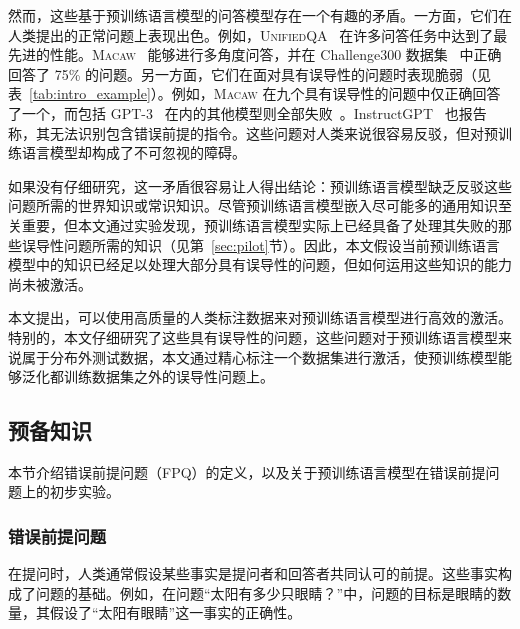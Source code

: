 然而，这些基于预训练语言模型的问答模型存在一个有趣的矛盾。一方面，它们在人类提出的正常问题上表现出色。例如，\textsc{UnifiedQA}~\cite{khashabi-etal-2020-unifiedqa} 在许多问答任务中达到了最先进的性能。\textsc{Macaw}~\cite{tafjord2021general} 能够进行多角度问答，并在 Challenge300 数据集~\cite{tafjord2021general} 中正确回答了 75\% 的问题。另一方面，它们在面对具有误导性的问题时表现脆弱（见表~\ref{tab:intro_example}）。例如，\textsc{Macaw} 在九个具有误导性的问题中仅正确回答了一个，而包括 GPT-3~\cite{brown2020language} 在内的其他模型则全部失败~\cite{tafjord2021general}。InstructGPT~\cite{ouyang2022training} 也报告称，其无法识别包含错误前提的指令。这些问题对人类来说很容易反驳，但对预训练语言模型却构成了不可忽视的障碍。

如果没有仔细研究，这一矛盾很容易让人得出结论：预训练语言模型缺乏反驳这些问题所需的世界知识或常识知识。尽管预训练语言模型嵌入尽可能多的通用知识至关重要，但本文通过实验发现，预训练语言模型实际上已经具备了处理其失败的那些误导性问题所需的知识（见第~\ref{sec:pilot}节）。因此，本文假设当前预训练语言模型中的知识已经足以处理大部分具有误导性的问题，但如何运用这些知识的能力尚未被激活。

本文提出，可以使用高质量的人类标注数据来对预训练语言模型进行高效的激活。特别的，本文仔细研究了这些具有误导性的问题，这些问题对于预训练语言模型来说属于分布外测试数据，本文通过精心标注一个数据集进行激活，使预训练模型能够泛化都训练数据集之外的误导性问题上。


\subsection{预备知识}
本节介绍错误前提问题（FPQ）的定义，以及关于预训练语言模型在错误前提问题上的初步实验。

\subsubsection{错误前提问题}
在提问时，人类通常假设某些事实是提问者和回答者共同认可的前提。这些事实构成了问题的基础。例如，在问题“太阳有多少只眼睛？”中，问题的目标是眼睛的数量，其假设了“太阳有眼睛”这一事实的正确性。

